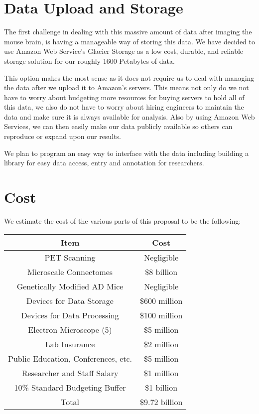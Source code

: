 \documentclass[11pt]{article}
\begin{document}
\section{Data Upload and Storage}

The first challenge in dealing with this massive amount of data after imaging the mouse brain, is having a manageable way of storing this data. We have decided to use Amazon Web Service’s Glacier Storage as a low cost, durable, and reliable storage solution for our roughly 1600 Petabytes of data. 

This option makes the most sense as it does not require us to deal with managing the data after we upload it to Amazon’s servers. This means not only do we not have to worry about budgeting more resources for buying servers to hold all of this data, we also do not have to worry about hiring engineers to maintain the data and make sure it is always available for analysis.  Also by using Amazon Web Services, we can then easily make our data publicly available so others can reproduce or expand upon our results.

We plan to program an easy way to interface with the data including building a library for easy data access, entry and annotation for researchers.

\section{Cost}

We estimate the cost of the various parts of this proposal to be the following:

\begin{center}
 \begin{tabular}{||c c||} 
 \hline
 Item & Cost \\ [0.5ex] 
 \hline\hline
 PET Scanning & Negligible \\ 
 \hline
 Microscale Connectomes & \$8 billion \\
 \hline
 Genetically Modified AD Mice & Negligible \\
 \hline
 Devices for Data Storage & \$600 million  \\
 \hline
 Devices for Data Processing & \$100 million  \\
 \hline
 Electron Microscope (5) &  \$5 million\\ 
 \hline
 Lab Insurance & \$2 million \\ 
 \hline
 Public Education, Conferences, etc. & \$5 million \\ 
 \hline
 Researcher and Staff Salary & \$1 million \\ 
 \hline
 10\% Standard Budgeting Buffer & \$1 billion \\[1ex] 
 \hline\hline
 Total & \$9.72 billion \\
 \hline
\end{tabular}
\end{center}
\end{document}
